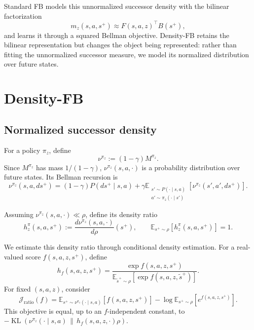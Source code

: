 \documentclass[11pt]{article}
\begin{document}
Standard FB models this unnormalized successor density with the bilinear factorization
\[
    m_z(s,a,s^+) \approx F(s,a,z)^\top B(s^+),
\]
and learns it through a squared Bellman objective. Density-FB retains the bilinear representation but changes the object being represented: rather than fitting the unnormalized successor measure, we model its normalized distribution over future states.


\section{Density-FB}
\label{sec:density-fb}

\subsection{Normalized successor density}

For a policy $\pi_z$, define
\begin{equation}
    \nu^{\pi_z} := (1-\gamma)M^{\pi_z}.
    \label{eq:nu-definition}
\end{equation}
Since $M^{\pi_z}$ has mass $1/(1-\gamma)$, $\nu^{\pi_z}(s,a,\cdot)$ is a probability distribution over future states. Its Bellman recursion is
\begin{equation}
    \nu^{\pi_z}(s,a,ds^+) = (1-\gamma)P(ds^+\mid s,a) + \gamma\mathbb E_{\substack{s'\sim P(\cdot\mid s,a)\\a'\sim\pi_z(\cdot\mid s')}}\left[\nu^{\pi_z}(s',a',ds^+)\right].
    \label{eq:nu-bellman}
\end{equation}

Assuming $\nu^{\pi_z}(s,a,\cdot)\ll\rho$, define its density ratio
\begin{equation}
    h_z^\pi(s,a,s^+) := \frac{d\nu^{\pi_z}(s,a,\cdot)}{d\rho}(s^+),
    \qquad
    \mathbb E_{s^+\sim\rho}\left[h_z^\pi(s,a,s^+)\right]=1.
    \label{eq:true-density-ratio}
\end{equation}

We estimate this density ratio through conditional density estimation. For a real-valued score $f(s,a,z,s^+)$, define
\begin{equation}
    h_f(s,a,z,s^+) =
    \frac{\exp f(s,a,z,s^+)}
    {\mathbb E_{\tilde s^+\sim\rho}\left[\exp f(s,a,z,\tilde s^+)\right]}.
    \label{eq:generic-density}
\end{equation}
For fixed $(s,a,z)$, consider
\begin{equation}
    \mathcal J_{\mathrm{ratio}}(f)
    =
    \mathbb E_{s^+\sim\nu^{\pi_z}(\cdot\mid s,a)}
    \left[f(s,a,z,s^+)\right]
    -
    \log\mathbb E_{s^+\sim\rho}
    \left[e^{f(s,a,z,s^+)}\right].
    \label{eq:ratio-objective}
\end{equation}
This objective is equal, up to an $f$-independent constant, to $-\operatorname{KL}\left( \nu^{\pi_z}(\cdot\mid s,a) \,\middle\|\, h_f(s,a,z,\cdot)\rho\right).$
\end{document}
